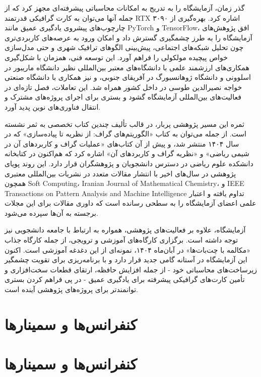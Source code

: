 \documentclass[
  letterpaper,
  DIV=11,
  numbers=noendperiod]{scrreprt}
\begin{document}
گذر زمان، آزمایشگاه را به تدریج به امکانات محاسباتی پیشرفته‌ای مجهز کرد
که از جمله آنها می‌توان به کارت گرافیکی قدرتمند RTX ۳۰۹۰ اشاره کرد.
بهره‌گیری از چارچوب‌های پیشروی یادگیری عمیق مانند PyTorch و TensorFlow،
افق پژوهش‌های آزمایشگاه را به طرز چشمگیری گسترش داد و امکان ورود به
عرصه‌های کاربردی‌تری چون تحلیل شبکه‌های اجتماعی، پیش‌بینی الگوهای ترافیک
شهری و حتی مدل‌سازی خواص پیچیده مولکولی را فراهم آورد. این توسعه فنی،
همزمان با شکل‌گیری همکاری‌های ارزشمند علمی با دانشگاه‌های معتبر بین‌المللی
نظیر دانشگاه ماریبور در اسلوونی و دانشگاه ژوهانسبورگ در آفریقای جنوبی، و
نیز همکاری با دانشگاه صنعتی خواجه نصیرالدین طوسی در داخل کشور همراه شد.
این تعاملات، فصل تازه‌ای در فعالیت‌های بین‌المللی آزمایشگاه گشود و بستری
برای اجرای پروژه‌های مشترک و انتقال فناوری‌های نوین پدید آورد.

ثمره این مسیر پژوهشی پربار، در قالب تألیف چندین کتاب تخصصی به ثمر نشسته
است. از جمله می‌توان به کتاب «الگوریتم‌های گراف: از نظریه تا پیاده‌سازی» که
در سال ۱۴۰۴ منتشر شد، و پیش از آن کتاب‌های «عملیات گراف و کاربردهای آن در
شیمی ریاضی» و «نظریه گراف و کاربردهای آن» اشاره کرد که هم‌اکنون در
کتابخانه دانشکده علوم ریاضی در دسترس دانشجویان و پژوهشگران قرار دارد.
این روند پویای پژوهشی در سال‌های اخیر با انتشار مقالات متعدد در نشریات
بین‌المللی معتبری همچون Soft Computing، Iranian Journal of Mathematical
Chemistry، و IEEE Transactions on Pattern Analysis and Machine
Intelligence تداوم یافته و اعتبار علمی اعضای آزمایشگاه را به سطحی رسانده
است که داوری مقالات برای این مجلات برجسته به آن‌ها سپرده می‌شود.

آزمایشگاه، علاوه بر فعالیت‌های پژوهشی، همواره به ارتباط با جامعه دانشجویی
نیز توجه داشته است. برگزاری کارگاه‌های آموزشی و ترویجی، از جمله کارگاه
جذاب «مکالمه با چت‌بات‌ها» در آبان‌ماه ۱۴۰۴، نمونه‌ای از این دغدغه آموزشی
است. اکنون این آزمایشگاه در آستانه گامی جدید قرار دارد و با برنامه‌ریزی
برای تقویت چشمگیر زیرساخت‌های محاسباتی خود - از جمله افزایش حافظه، ارتقای
قطعات سخت‌افزاری و تأمین کارت‌های گرافیکی پیشرفته برای یادگیری عمیق - در
پی فراهم کردن بستری توانمندتر برای پروژه‌های پژوهشی آینده است.


\chapter{کنفرانس‌ها و
سمینارها}\label{ux6a9ux646ux641ux631ux627ux646ux633ux647ux627-ux648-ux633ux645ux6ccux646ux627ux631ux647ux627}


\chapter{کنفرانس‌ها و
سمینارها}\label{ux6a9ux646ux641ux631ux627ux646ux633ux647ux627-ux648-ux633ux645ux6ccux646ux627ux631ux647ux627-1}
\end{document}
